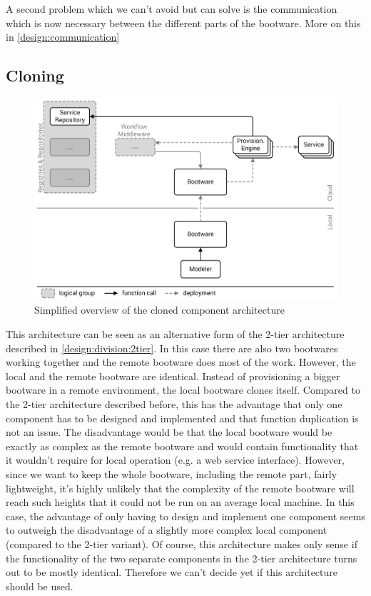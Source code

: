 A second problem which we can't avoid but can solve is the communication which is now necessary between the different parts of the bootware.
More on this in \autoref{design:communication}

\subsection{Cloning}

\begin{figure}[!htbp]
	\centering
	\includegraphics[resolution=600]{design/assets/simple_clone}
	\caption{Simplified overview of the cloned component architecture}
	\label{image:clone}
\end{figure}

This architecture can be seen as an alternative form of the 2-tier architecture described in \autoref{design:division:2tier}.
In this case there are also two bootwares working together and the remote bootware does most of the work.
However, the local and the remote bootware are identical.
Instead of provisioning a bigger bootware in a remote environment, the local bootware clones itself.
Compared to the 2-tier architecture described before, this has the advantage that only one component has to be designed and implemented and that function duplication is not an issue.
The disadvantage would be that the local bootware would be exactly as complex as the remote bootware and would contain functionality that it wouldn't require for local operation (e.g. a web service interface).
However, since we want to keep the whole bootware, including the remote part, fairly lightweight, it's highly unlikely that the complexity of the remote bootware will reach such heights that it could not be run on an average local machine.
In this case, the advantage of only having to design and implement one component seems to outweigh the disadvantage of a slightly more complex local component (compared to the 2-tier variant).
Of course, this architecture makes only sense if the functionality of the two separate components in the 2-tier architecture turns out to be mostly identical.
Therefore we can't decide yet if this architecture should be used.

